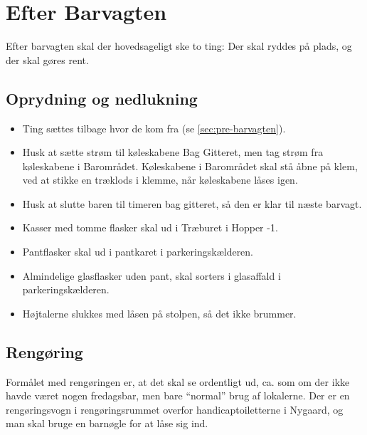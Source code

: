 \section{Efter Barvagten}
\label{sec:post-barvagten}

Efter barvagten skal der hovedsageligt ske to ting: Der skal ryddes på
plads, og der skal gøres rent.

\subsection{Oprydning og nedlukning}
\label{sec:post:oprydning}

\begin{itemize}
	\item Ting sættes tilbage hvor de kom fra (se
	\autoref{sec:pre-barvagten}).
	\item Husk at sætte strøm til køleskabene Bag Gitteret,
	men tag strøm fra køleskabene i Barområdet.
	Køleskabene i Barområdet skal stå åbne på klem,
	ved at stikke en træklods i klemme, når køleskabene låses igen.
	\item Husk at slutte baren til timeren bag gitteret, så den
	er klar til næste barvagt.
	\item Kasser med tomme flasker skal ud i Træburet i Hopper -1.
	\item Pantflasker skal ud i pantkaret i parkeringskælderen.
	\item Almindelige glasflasker uden pant, skal sorters i glasaffald i parkeringskælderen.
	\item Højtalerne slukkes med låsen på stolpen, så det ikke brummer.
\end{itemize}

\subsection{Rengøring}
\label{sec:post:rengoring}

Formålet med rengøringen er, at det skal se ordentligt ud, ca. som om
der ikke havde været nogen fredagsbar, men bare ``normal'' brug af
lokalerne. Der er en rengøringsvogn i
rengøringsrummet overfor handicaptoiletterne i Nygaard,
og man skal bruge en barnøgle for at låse sig ind.

